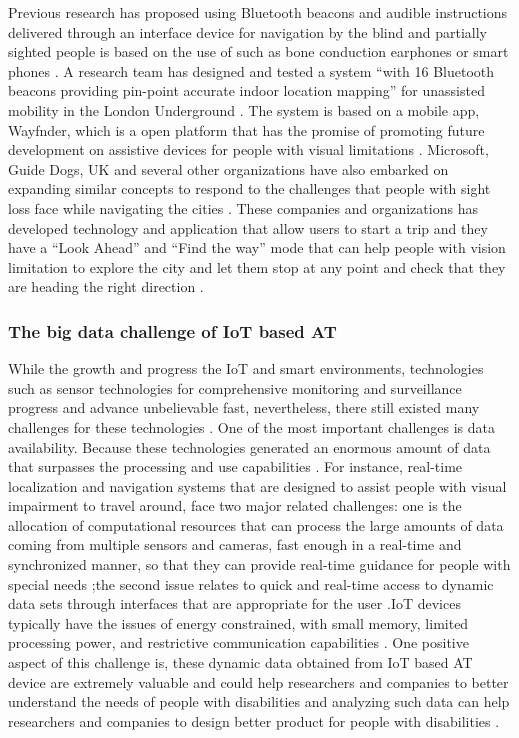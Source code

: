 Previous research has proposed using Bluetooth beacons and audible 
instructions delivered through an interface device for navigation 
by the blind and partially sighted people is based on the use of 
such as bone conduction earphones or smart phones \cite{Barbeau,Shah}. 
A research team has designed and tested a system ``with 16 Bluetooth beacons 
providing pin-point accurate indoor location mapping'' 
for unassisted mobility in the London Underground \cite{Shah}. The system is based on a mobile app, Wayfnder,  which is 
a open platform that has the promise of promoting future 
development on assistive devices for people with visual limitations \cite{Shah}. 
Microsoft, Guide Dogs, UK and several other organizations have also embarked
on expanding similar concepts to respond to the challenges that people with sight
loss face while navigating the cities \cite{Shah}.  These companies and organizations
has developed technology and application that allow users to start a trip and they 
have a ``Look Ahead'' and ``Find the way'' mode that can help people with vision
limitation to explore the city and let them stop at any point and check 
that they are heading the right direction \cite{Barbeau}. 

\subsubsection{The big data challenge of IoT based AT}
While the growth and progress the IoT and smart
environments, technologies such as sensor technologies for comprehensive
monitoring and surveillance progress and advance unbelievable fast, nevertheless,
there still existed many challenges for these  technologies \cite{Shah}. 
One of the most important challenges is data availability. Because these technologies generated an
enormous amount of data that surpasses the processing and use capabilities \cite{Shah}. For
instance, real-time localization and navigation systems that are designed to assist people 
with visual impairment to travel around, face two major related challenges: one is 
the allocation of computational resources that can process the large
amounts of data coming from multiple sensors and cameras, fast enough in a real-time
and synchronized manner, so that they can provide real-time guidance for people 
with special needs \cite{Shah};the second issue relates to quick and real-time access to
dynamic data sets through interfaces that are appropriate for the user \cite{Shah}.IoT devices 
typically have the issues of energy constrained, with small memory, limited processing 
power, and restrictive communication capabilities \cite{Shah}. One positive aspect of this 
challenge is, these dynamic data obtained from IoT based AT device are extremely 
valuable and could help researchers and companies to better understand the 
needs of people with disabilities and analyzing such data can help researchers 
and companies to design better product for people with disabilities \cite{dewsbury03}.

